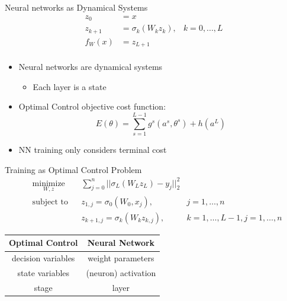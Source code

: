 \documentclass[11pt,t]{beamer}
\begin{document}
\begin{frame}[fragile]{Neural networks as Dynamical Systems}
\begin{equation*}
	\begin{aligned}
	z_0 &= x \\
	z_{k+1} &= \sigma_k(W_kz_k), & k = 0,...,L \\
	f_W(x) &= z_{L+1} \\
	\end{aligned}
\label{st-eq}
\end{equation*}
\begin{itemize}
	\item Neural networks are dynamical systems
	\begin{itemize}
		\item Each layer is a state
	\end{itemize}
	\item Optimal Control objective  cost function:
	\begin{equation*}
		E(\theta) = \sum\limits_{s=1}^{L-1}g^s(a^s,\theta^s) + h(a^L)
	\end{equation*}
	\item NN training only considers terminal cost
\end{itemize}

\end{frame}
\begin{frame}[fragile]{Training as Optimal Control Problem}
\begin{equation*}
	\begin{aligned}
	& \underset{W,z}{\text{minimize}}
	& & \sum\limits_{j=0}^{n}||\sigma_L(W_Lz_L) - y_j||^2_2 \\
	& \text{subject to}
	& & z_{1,j} = \sigma_0(W_0,x_j), &j = 1,\ldots,n \\
	& & & z_{k+1,j} = \sigma_k(W_kz_{k,j}), &k = 1,\ldots,L-1,j = 1,\ldots,n
	\end{aligned}
	\label{ocp-eq}
\end{equation*}
\begin{table}
\centering
	\begin{tabular}{ c | c }
	Optimal Control & Neural Network\\ \hline
	decision variables & weight parameters\\
	state variables & (neuron) activation\\
	stage & layer \\
	\end{tabular}
\end{table}
\end{frame}
\end{document}
